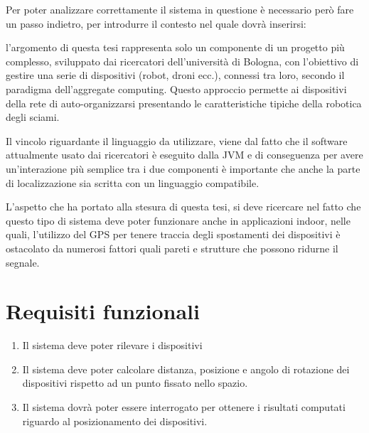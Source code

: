 \documentclass[12pt,a4paper,openright,twoside]{book}
\begin{document}
Per poter analizzare correttamente il sistema in questione è necessario però fare un passo indietro, per introdurre il contesto nel quale dovrà inserirsi:
\begin{adjustwidth}{1cm}{0cm}
l'argomento di questa tesi rappresenta solo un componente di un progetto più complesso, sviluppato dai ricercatori dell'università di Bologna, con l'obiettivo di gestire una serie di dispositivi (robot, droni ecc.), connessi tra loro, secondo il paradigma dell'aggregate computing.
Questo approccio permette ai dispositivi della rete di auto-organizzarsi presentando le caratteristiche tipiche della robotica degli sciami.

Il vincolo riguardante il linguaggio da utilizzare, viene dal fatto che il software attualmente usato dai ricercatori è eseguito dalla JVM e di conseguenza per avere un'interazione più semplice tra i due componenti è importante che anche la parte di localizzazione sia scritta con un linguaggio compatibile.
\end{adjustwidth}

L'aspetto che ha portato alla stesura di questa tesi, si deve ricercare nel fatto che questo tipo di sistema deve poter funzionare anche in applicazioni indoor, nelle quali, l'utilizzo del GPS per tenere traccia degli spostamenti dei dispositivi è ostacolato da numerosi fattori quali pareti e strutture che possono ridurne il segnale.

\section{Requisiti funzionali} \label{sec:requisiti_funzionali}
\begin{enumerate}[label=RF\arabic*]
	\item Il sistema deve poter rilevare i dispositivi
	\item Il sistema deve poter calcolare distanza, posizione e angolo di rotazione dei dispositivi rispetto ad un punto fissato nello spazio.
	\item Il sistema dovrà poter essere interrogato per ottenere i risultati computati riguardo al posizionamento dei dispositivi.
\end{enumerate}
\end{document}

